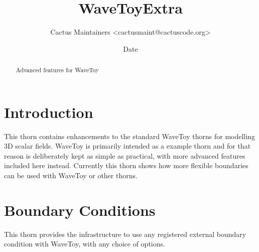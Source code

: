 \documentclass{article}
\begin{document}
\author{Cactus Maintainers \textless cactusmaint@cactuscode.org\textgreater}

\title{WaveToyExtra}

\date{$ $Date$ $}

\maketitle



\begin{abstract}
Advanced features for WaveToy
\end{abstract}


\section{Introduction}

This thorn contains enhancements to the standard WaveToy thorns for 
modelling 3D scalar fields. WaveToy is primarily intended as a 
example thorn and for that reason is deliberately kept as simple
as practical, with more advanced features included here instead. 
Currently this thorn shows how more flexible boundaries can be 
used with WaveToy or other thorns.

\section{Boundary Conditions}

This thorn provides the infrastructure to use any registered 
external boundary condition with WaveToy, with any choice of options. 

\end{document}
